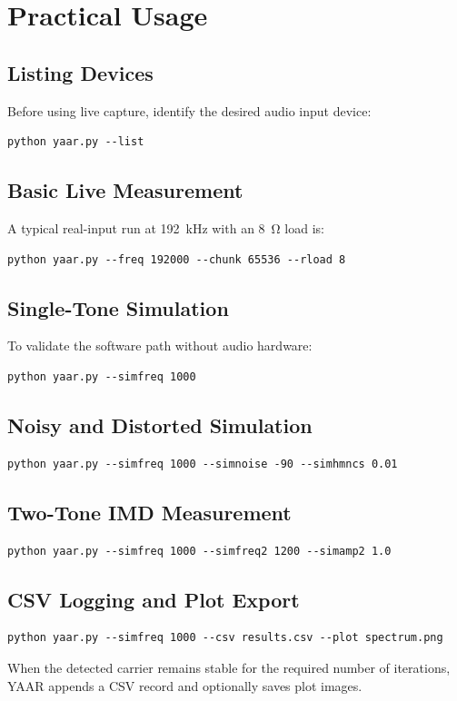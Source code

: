\documentclass[conference]{IEEEtran}
\begin{document}
\section{Practical Usage}
\subsection{Listing Devices}
Before using live capture, identify the desired audio input device:
\begin{lstlisting}[style=shellstyle]
python yaar.py --list
\end{lstlisting}

\subsection{Basic Live Measurement}
A typical real-input run at \SI{192}{kHz} with an \SI{8}{\ohm} load is:
\begin{lstlisting}[style=shellstyle]
python yaar.py --freq 192000 --chunk 65536 --rload 8
\end{lstlisting}

\subsection{Single-Tone Simulation}
To validate the software path without audio hardware:
\begin{lstlisting}[style=shellstyle]
python yaar.py --simfreq 1000
\end{lstlisting}

\subsection{Noisy and Distorted Simulation}
\begin{lstlisting}[style=shellstyle]
python yaar.py --simfreq 1000 --simnoise -90 --simhmncs 0.01
\end{lstlisting}

\subsection{Two-Tone IMD Measurement}
\begin{lstlisting}[style=shellstyle]
python yaar.py --simfreq 1000 --simfreq2 1200 --simamp2 1.0
\end{lstlisting}

\subsection{CSV Logging and Plot Export}
\begin{lstlisting}[style=shellstyle]
python yaar.py --simfreq 1000 --csv results.csv --plot spectrum.png
\end{lstlisting}
When the detected carrier remains stable for the required number of iterations, YAAR appends a CSV record and optionally saves plot images.
\end{document}
